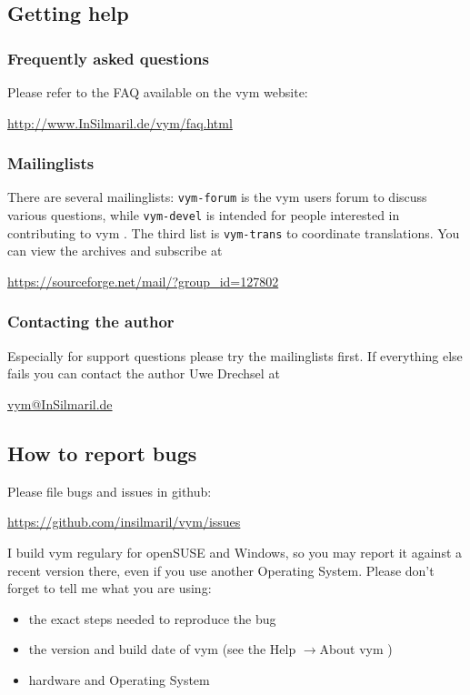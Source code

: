 \documentclass[12pt,a4paper]{article}
\newcommand{\vym}{{\sc vym }}
\newcommand{\ra}{$\longrightarrow$}
\begin{document}
\begin{appendix}
\subsection{Getting help}

\subsubsection*{Frequently asked questions}
Please refer to the FAQ available on the \vym website:
\begin{center}
\href{http://www.InSilmaril.de/vym/faq.html}{http://www.InSilmaril.de/vym/faq.html}
\end{center}

\subsubsection*{Mailinglists}
There are several mailinglists: {\tt vym-forum} is the \vym users forum to
discuss various questions, while {\tt vym-devel} is intended for people
interested in contributing to \vym. The third list is {\tt vym-trans} to
coordinate translations. You can view the archives and subscribe at
\begin{center}
\href{https://sourceforge.net/mail/?group_id=127802}{https://sourceforge.net/mail/?group\_id=127802}
\end{center}

\subsubsection*{Contacting the author}\label{author}
Especially for support questions please try the mailinglists first. If
everything else fails you can contact the author Uwe Drechsel at
\begin{center}
\href{mailto:vym@InSilmaril.de}{vym@InSilmaril.de}
\end{center}



\subsection{How to report bugs}
Please file bugs and issues in github: 
\begin{center}
    \href{ https://github.com/insilmaril/vym/issues}{https://github.com/insilmaril/vym/issues}
\end{center}

I build \vym regulary for openSUSE and Windows, so you may report it against a
recent version there, even if you  use another Operating System.
Please don't forget to tell me what you are using:
\begin{itemize}
    \item the exact steps needed to reproduce the bug
    \item the version and build date of \vym (see the Help \ra About
    \vym)
    \item hardware and Operating System
\end{itemize}


\end{appendix}
\end{document}
